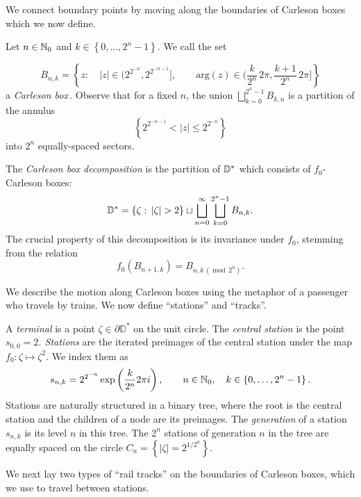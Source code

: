 We connect boundary points by moving along the boundaries of Carleson boxes which we now define.
\begin{definition}
Let $n\in\mathbb{N}_{0}$ and $k\in\left\{ 0,\ldots,2^{n}-1\right\} $. We call the set

\[
B_{n,k}=\left\{ z:\quad\left|z\right|\in\biggl(2^{2^{-n}},2^{2^{-n-1}}\biggl],\qquad\mathrm{arg}(z)\in\biggl(\frac{k}{2^{n}} \, 2\pi,\frac{k+1}{2^{n}} \, 2\pi\biggl]\right\} 
\]
a \emph{Carleson box}\,.
Observe that for a fixed $n$, the union $\bigsqcup_{k=0}^{2^{n}-1}B_{k,n}$
is a partition of the annulus 
\[
\left\{ 2^{2^{-n-1}}<\left|z\right|\leq2^{2^{-n}}\right\} 
\]
 into $2^{n}$ equally-spaced sectors.
 
The \emph{Carleson box decomposition} is the partition of $\mathbb{D}^{*}$ which consists of $f_{0}$-Carleson
boxes:
\[
\D^{*}=\left\{ \zeta:\,\left|\zeta\right|>2\right\} \sqcup\bigsqcup_{n=0}^{\infty}\bigsqcup_{k=0}^{2^{n}-1}B_{n,k}.
\]
The crucial property of this decomposition is its invariance under $f_{0}$,
stemming from the relation
\begin{equation*}
f_{0}\left(B_{n+1,k}\right)=B_{n,k \,(\operatorname{mod} \,2^n)}.
\end{equation*}
\end{definition}

We describe the motion along Carleson boxes using the metaphor of a passenger who travels by trains. 
We now define \enquote{stations} and \enquote{tracks}.

\begin{definition}
A \emph{terminal} is a point $\zeta \in \partial \mathbb D^*$ on the unit circle.
The \emph{central station} is the point\emph{ $s_{0,0}=2$. Stations
}are the iterated preimages of the central station under the map $f_{0}:\zeta\mapsto \zeta^{2}$.
We index them as 
\[
s_{n,k}=2^{2^{-n}}\exp\left(\frac{k}{2^{n}}2\pi i\right),\qquad n\in\mathbb{N}_{0},\quad k\in\left\{ 0,\ldots,2^{n}-1\right\} .
\]
Stations are naturally structured in a binary tree, where the root is the central station and the children of a node are its preimages. The \emph{generation} of a station $s_{n,k}$ is its level $n$ in this tree. The $2^{n}$ stations of generation $n$ in the tree are equally spaced on the circle $C_{n}=\left\{ \left|\zeta\right|=2^{1/2^{n}}\right\} $. 
\end{definition}

We next lay two types of \enquote{rail tracks} on the boundaries of Carleson boxes, which we use to travel between stations.

